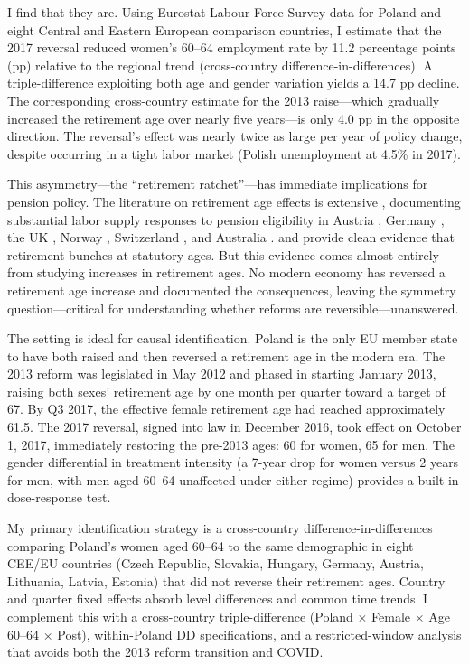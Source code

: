 \documentclass[12pt]{article}
\begin{document}
I find that they are. Using Eurostat Labour Force Survey data for Poland and eight Central and Eastern European comparison countries, I estimate that the 2017 reversal reduced women's 60--64 employment rate by 11.2 percentage points (pp) relative to the regional trend (cross-country difference-in-differences). A triple-difference exploiting both age and gender variation yields a 14.7 pp decline. The corresponding cross-country estimate for the 2013 raise---which gradually increased the retirement age over nearly five years---is only 4.0 pp in the opposite direction. The reversal's effect was nearly twice as large per year of policy change, despite occurring in a tight labor market (Polish unemployment at 4.5\% in 2017).

This asymmetry---the ``retirement ratchet''---has immediate implications for pension policy. The literature on retirement age effects is extensive \citep{gruber1999social,blundell2016labor,borsch2018does}, documenting substantial labor supply responses to pension eligibility in Austria \citep{staubli2013raising}, Germany \citep{seibold2021reference,geyer2020labor}, the UK \citep{cribb2016signals}, Norway \citep{vestad2013labour}, Switzerland \citep{hanel2012impact}, and Australia \citep{atalay2019effects}. \citet{mastrobuoni2009labor} and \citet{manoli2015estimating} provide clean evidence that retirement bunches at statutory ages. But this evidence comes almost entirely from studying increases in retirement ages. No modern economy has reversed a retirement age increase and documented the consequences, leaving the symmetry question---critical for understanding whether reforms are reversible---unanswered.

The setting is ideal for causal identification. Poland is the only EU member state to have both raised and then reversed a retirement age in the modern era. The 2013 reform was legislated in May 2012 and phased in starting January 2013, raising both sexes' retirement age by one month per quarter toward a target of 67. By Q3 2017, the effective female retirement age had reached approximately 61.5. The 2017 reversal, signed into law in December 2016, took effect on October 1, 2017, immediately restoring the pre-2013 ages: 60 for women, 65 for men. The gender differential in treatment intensity (a 7-year drop for women versus 2 years for men, with men aged 60--64 unaffected under either regime) provides a built-in dose-response test.

My primary identification strategy is a cross-country difference-in-differences comparing Poland's women aged 60--64 to the same demographic in eight CEE/EU countries (Czech Republic, Slovakia, Hungary, Germany, Austria, Lithuania, Latvia, Estonia) that did not reverse their retirement ages. Country and quarter fixed effects absorb level differences and common time trends. I complement this with a cross-country triple-difference (Poland $\times$ Female $\times$ Age 60--64 $\times$ Post), within-Poland DD specifications, and a restricted-window analysis that avoids both the 2013 reform transition and COVID.
\end{document}
